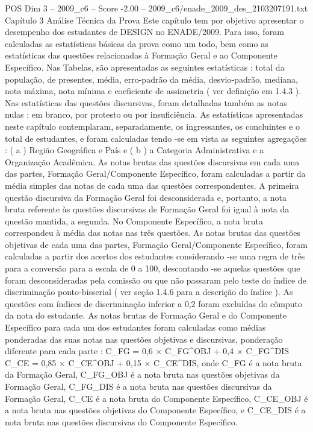 \begin{textsample}{POS Dim 3 – 2009\_c6 – Score -2.00 – 2009\_c6/enade\_2009\_des\_2103207191.txt}  \label{ex:f3_pos_238}
Capítulo 3 Análise Técnica da Prova Este capítulo tem por objetivo apresentar o desempenho dos estudantes de DESIGN no ENADE/2009.
Para isso, foram calculadas as estatísticas básicas da prova como um todo, bem como as estatísticas das questões relacionadas à Formação Geral e ao Componente Específico.
Nas Tabelas, são apresentadas as seguintes estatísticas : total da população, de presentes, média, erro-padrão da média, desvio-padrão, mediana, nota máxima, nota mínima e coeficiente de assimetria ( ver definição em 1.4.3 ).
Nas estatísticas das questões discursivas, foram detalhadas também as notas nulas : em branco, por protesto ou por insuficiência.
As estatísticas apresentadas neste capítulo contemplaram, separadamente, os ingressantes, os concluintes e o total de estudantes, e foram calculadas tendo -se em vista as seguintes agregações : ( a ) Região Geográfica e País e ( b ) a Categoria Administrativa e a Organização Acadêmica.
As notas brutas das questões discursivas em cada uma das partes, Formação Geral/Componente Específico, foram calculadas a partir da média simples das notas de cada uma das questões correspondentes.
A primeira questão discursiva da Formação Geral foi desconsiderada e, portanto, a nota bruta referente às questões discursivas de Formação Geral foi igual à nota da questão mantida, a segunda.
No Componente Específico, a nota bruta correspondeu à média das notas nas três questões.
As notas brutas das questões objetivas de cada uma das partes, Formação Geral/Componente Específico, foram calculadas a partir dos acertos dos estudantes considerando -se uma regra de três para a conversão para a escala de 0 a 100, descontando -se aquelas questões que foram desconsideradas pela comissão ou que não passaram pelo teste do índice de discriminação ponto-bisserial ( ver seção 1.4.6 para a descrição do índice ).
As questões com índices de discriminação inferior a 0,2 foram excluídas do cômputo da nota do estudante.
As notas brutas de Formação Geral e do Componente Específico para cada um dos estudantes foram calculadas como médias ponderadas das suas notas nas questões objetivas e discursivas, ponderação diferente para cada parte : C\_FG = 0,6 × C\_FG\textasciicircum{}OBJ + 0,4 × C\_FG\textasciicircum{}DIS C\_CE = 0,85 × C\_CE\textasciicircum{}OBJ + 0,15 × C\_CE\textasciicircum{}DIS, onde C\_FG é a nota bruta da Formação Geral, C\_FG\_OBJ é a nota bruta nas questões objetivas da Formação Geral, C\_FG\_DIS é a nota bruta nas questões discursivas da Formação Geral, C\_CE é a nota bruta do Componente Específico, C\_CE\_OBJ é a nota bruta nas questões objetivas do Componente Específico, e C\_CE\_DIS é a nota bruta nas questões discursivas do Componente Específico.

\end{textsample}
